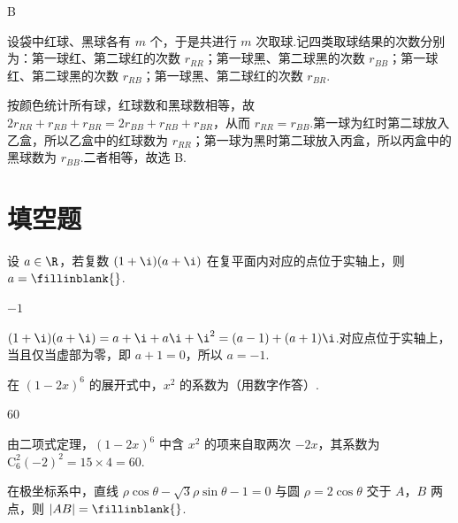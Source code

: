 \begin{answer}
B
\end{answer}

\begin{solution}
设袋中红球、黑球各有 \(m\) 个，于是共进行 \(m\) 次取球.记四类取球结果的次数分别为：第一球红、第二球红的次数 \(r_{RR}\)；第一球黑、第二球黑的次数 \(r_{BB}\)；第一球红、第二球黑的次数 \(r_{RB}\)；第一球黑、第二球红的次数 \(r_{BR}\).

按颜色统计所有球，红球数和黑球数相等，故
\(2r_{RR}+r_{RB}+r_{BR}=2r_{BB}+r_{RB}+r_{BR}\)，从而 \(r_{RR}=r_{BB}\).第一球为红时第二球放入乙盒，所以乙盒中的红球数为 \(r_{RR}\)；第一球为黑时第二球放入丙盒，所以丙盒中的黑球数为 \(r_{BB}\).二者相等，故选 B.
\end{solution}

\section{填空题}

\begin{problem}
设 \(a\in\R\)，若复数 \((1+\i)(a+\i)\) 在复平面内对应的点位于实轴上，则 \(a=\fillinblank{}\).
\end{problem}

\begin{answer}
\(-1\)
\end{answer}

\begin{solution}
\((1+\i)(a+\i)=a+\i+a\i+\i^2=(a-1)+(a+1)\i\).对应点位于实轴上，当且仅当虚部为零，即 \(a+1=0\)，所以 \(a=-1\).
\end{solution}

\begin{problem}
在 \((1-2x)^6\) 的展开式中，\(x^2\) 的系数为\fillinblank{}（用数字作答）.
\end{problem}

\begin{answer}
60
\end{answer}

\begin{solution}
由二项式定理，\((1-2x)^6\) 中含 \(x^2\) 的项来自取两次 \(-2x\)，其系数为
\(\mathrm C_6^2(-2)^2=15\times4=60\).
\end{solution}

\begin{problem}
在极坐标系中，直线 \(\rho\cos\theta-\sqrt{3}\rho\sin\theta-1=0\) 与圆 \(\rho=2\cos\theta\) 交于 \(A\)，\(B\) 两点，则 \(|AB|=\fillinblank{}\).
\end{problem}

